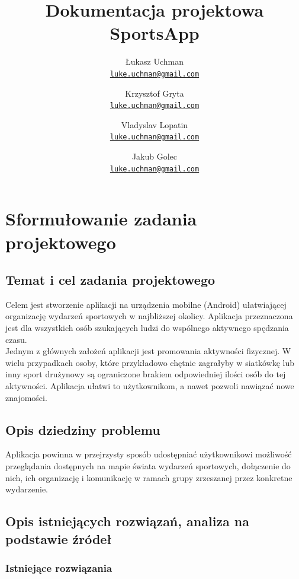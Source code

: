 \documentclass[12pt,a4paper]{report}
\title{\Large{Dokumentacja projektowa}\huge\\SportsApp\\}
\date{\parbox{\linewidth}{\centering%
  ~\endgraf\bigskip
  ~\endgraf\bigskip
  15.06.2018%
  \endgraf\bigskip
  AGH, Informatyka WIEiT\\
  \endgraf\bigskip
  Semestr 6\\
  \endgraf\bigskip
  Rok akademicki 2017/18\\
  \endgraf\bigskip}}
\author{
  Łukasz Uchman\\
  \href{mailto:luke.uchman@gmail.com}{\texttt{luke.uchman@gmail.com}}\\
  \and  
  Krzysztof Gryta\\
  \href{mailto:luke.uchman@gmail.com}{\texttt{luke.uchman@gmail.com}}
  \and  
  Vladyslav Lopatin\\
  \href{mailto:luke.uchman@gmail.com}{\texttt{luke.uchman@gmail.com}}
  \and  
  Jakub Golec\\
  \href{mailto:luke.uchman@gmail.com}{\texttt{luke.uchman@gmail.com}}
}
\begin{document}
\maketitle

\tableofcontents
\newpage
\section{Sformułowanie zadania projektowego}

\subsection{Temat i cel zadania projektowego}

Celem jest stworzenie aplikacji na urządzenia mobilne (Android) ułatwiającej organizację wydarzeń sportowych w najbliższej okolicy. Aplikacja przeznaczona jest dla wszystkich osób szukających ludzi do wspólnego aktywnego spędzania czasu.\\

Jednym z głównych założeń aplikacji jest promowania aktywności fizycznej. W wielu przypadkach osoby, które przykładowo chętnie zagrałyby w siatkówkę lub inny sport drużynowy są ograniczone brakiem odpowiedniej ilości osób do tej aktywności. Aplikacja ułatwi to użytkownikom, a nawet pozwoli nawiązać nowe znajomości.

\subsection{Opis dziedziny problemu}

Aplikacja powinna w przejrzysty sposób udostępniać użytkownikowi możliwość przeglądania dostępnych na mapie świata wydarzeń sportowych, dołączenie do nich, ich organizację i komunikację w ramach grupy zrzeszanej przez konkretne wydarzenie.

\subsection{Opis istniejących rozwiązań, analiza na podstawie źródeł}

\subsubsection{Istniejące rozwiązania}
\end{document}
